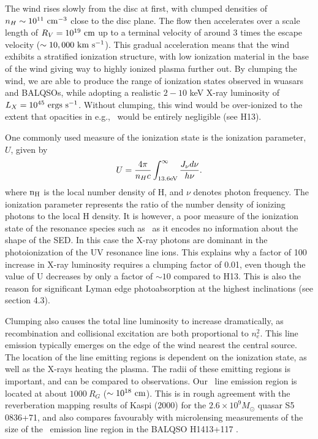 \documentclass[preprint, a4paper, 11pt]{aastex}
\begin{document}
The wind rises slowly from the disc at first, with clumped densities
of $n_H \sim 10^{11}~\rm{cm^{-3}}$ close to the disc plane.
The flow then accelerates over a scale length of $R_V=10^{19}~\rm{cm}$
up to a terminal velocity of around $3$ times the escape velocity 
($\sim10,000~\rm{km~s^{-1}}$). This gradual acceleration means that
the wind exhibits a stratified ionization structure, with low ionization material
in the base of the wind giving way to highly ionized plasma further out.
By clumping the wind, we are able to produce the range of ionization states observed
in wuasars and BALQSOs, while adopting a realistic $2-10$ keV X-ray luminosity
of $L_{X}=10^{45}~\rm{ergs~s^{-1}}$. Without clumping, this wind would be over-ionized 
to the extent that opacities in e.g., \civ\ would be entirely negligible (see H13).

One commonly used measure of the ionization state is the ionization parameter, $U$, given by
\begin{equation}
U = \frac{4\pi}{n_H c}\int_{13.6{\rm{eV}}}^{\infty}\frac{{J_{\nu}d\nu}}{h\nu}.
\end{equation}
\noindent where $\rm{n_H}$ is the local number density of H, and $\nu$ denotes photon 
frequency. The ionization parameter represents the ratio of the number density of 
ionizing photons to the local H density. It is however, a poor measure of the 
ionization state of the resonance species such as \civ\ as it encodes no information
about the shape of the SED. In this case the X-ray photons 
are dominant in the photoionization of the UV resonance line ions. 
This explains why a factor of 100 increase in X-ray luminosity requires
a clumping factor of 0.01, even though the value of U decreases by only a factor of $\sim10$ 
compared to H13. This is also the reason for significant Lyman edge photoabsorption
at the highest inclinations (see section 4.3).

Clumping also causes the total line luminosity to increase dramatically,
as recombination and collisional excitation are both proportional to
$n_e^2$. This line emission typically emerges on the edge of the wind
nearest the central source. The location of the line emitting regions
is dependent on the ionization state, as well as the X-rays heating the plasma.
The radii of these emitting regions is important,
and can be compared to observations. Our \civ\ line emission region 
is located at about $1000~R_G$ ($\sim10^{18}~\rm{cm}$).
This is in rough agreement with the reverberation mapping 
results of Kaspi (2000) for the $2.6\times10^{9} M_\odot$ quasar S5 0836+71,
and also compares favourably with microlensing measurements of the size of the
\civ\ emission line region in the BALQSO H1413+117 \citep{odowd2015}.
\end{document}
